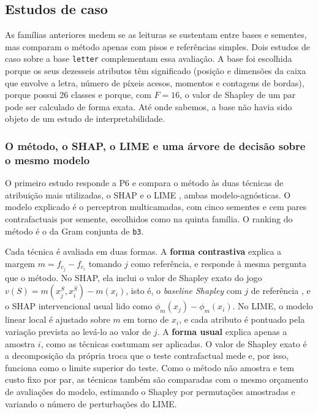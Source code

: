 \subsection{Estudos de caso}\label{subsec:estudos_caso}

As famílias anteriores medem se as leituras se sustentam entre bases e sementes, mas comparam o método apenas com pisos e referências simples. Dois estudos de caso sobre a base \texttt{letter} \citep{FreySlate1991} complementam essa avaliação. A base foi escolhida porque os seus dezesseis atributos têm significado (posição e dimensões da caixa que envolve a letra, número de píxeis acesos, momentos e contagens de bordas), porque possui 26 classes e porque, com $F = 16$, o valor de Shapley de um par pode ser calculado de forma exata. Até onde sabemos, a base não havia sido objeto de um estudo de interpretabilidade.

\subsubsection*{O método, o SHAP, o LIME e uma árvore de decisão sobre o mesmo modelo}

O primeiro estudo responde a P6 e compara o método às duas técnicas de atribuição mais utilizadas, o SHAP \citep{LundbergLee2017} e o LIME \citep{Ribeiro2016}, ambas modelo-agnósticas. O modelo explicado é o perceptron multicamadas, com cinco sementes e cem pares contrafactuais por semente, escolhidos como na quinta família. O ranking do método é o da Gram conjunta de \texttt{b3}.

Cada técnica é avaliada em duas formas. A \textbf{forma contrastiva} explica a margem $m = f_{c_j} - f_{c_i}$ tomando $j$ como referência, e responde à mesma pergunta que o método. No SHAP, ela inclui o valor de Shapley exato do jogo $v(S) = m(x_j^{S}, x_i^{\bar S}) - m(x_i)$, isto é, o \textit{baseline Shapley} com $j$ de referência \citep{SundararajanNajmi2020}, e o SHAP intervencional usual lido como $\phi_m(x_j) - \phi_m(x_i)$. No LIME, o modelo linear local é ajustado sobre $m$ em torno de $x_i$, e cada atributo é pontuado pela variação prevista ao levá-lo ao valor de $j$. A \textbf{forma usual} explica apenas a amostra $i$, como as técnicas costumam ser aplicadas. O valor de Shapley exato é a decomposição da própria troca que o teste contrafactual mede e, por isso, funciona como o limite superior do teste. Como o método não amostra e tem custo fixo por par, as técnicas também são comparadas com o mesmo orçamento de avaliações do modelo, estimando o Shapley por permutações amostradas \citep{Strumbelj2014} e variando o número de perturbações do LIME.


